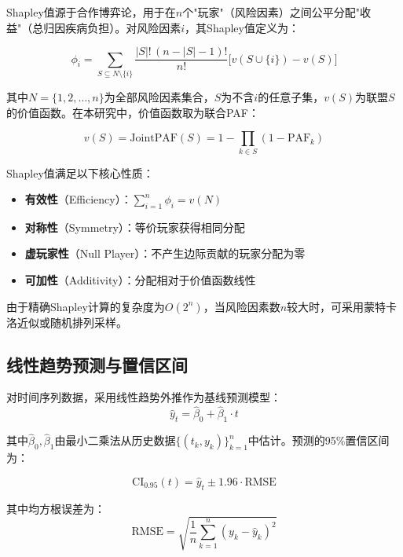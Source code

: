 \documentclass[12pt,a4paper]{ctexart}
\begin{document}
Shapley值源于合作博弈论，用于在$n$个"玩家"（风险因素）之间公平分配"收益"（总归因疾病负担）。对风险因素$i$，其Shapley值定义为：

\begin{equation}
\label{eq:shapley}
\phi_i = \sum_{S \subseteq N \setminus \{i\}} \frac{|S|!\,(n - |S| - 1)!}{n!}\bigl[v(S \cup \{i\}) - v(S)\bigr]
\end{equation}

其中$N = \{1, 2, \ldots, n\}$为全部风险因素集合，$S$为不含$i$的任意子集，$v(S)$为联盟$S$的价值函数。在本研究中，价值函数取为联合PAF：

\begin{equation}
    v(S) = \text{JointPAF}(S) = 1 - \prod_{k \in S}(1 - \text{PAF}_k)
\end{equation}

Shapley值满足以下核心性质：
\begin{itemize}[leftmargin=1.5em]
    \item \textbf{有效性}（Efficiency）：$\sum_{i=1}^{n} \phi_i = v(N)$
    \item \textbf{对称性}（Symmetry）：等价玩家获得相同分配
    \item \textbf{虚玩家性}（Null Player）：不产生边际贡献的玩家分配为零
    \item \textbf{可加性}（Additivity）：分配相对于价值函数线性
\end{itemize}

由于精确Shapley计算的复杂度为$O(2^n)$，当风险因素数$n$较大时，可采用蒙特卡洛近似或随机排列采样。

\subsection{线性趋势预测与置信区间}

对时间序列数据，采用线性趋势外推作为基线预测模型：
\begin{equation}
\label{eq:forecast}
    \hat{y}_t = \hat{\beta}_0 + \hat{\beta}_1 \cdot t
\end{equation}

其中$\hat{\beta}_0, \hat{\beta}_1$由最小二乘法从历史数据$\{(t_k, y_k)\}_{k=1}^{n}$中估计。预测的95\%置信区间为：

\begin{equation}
    \text{CI}_{0.95}(t) = \hat{y}_t \pm 1.96 \cdot \text{RMSE}
\end{equation}

其中均方根误差为：
\begin{equation}
    \text{RMSE} = \sqrt{\frac{1}{n}\sum_{k=1}^{n}(y_k - \hat{y}_k)^2}
\end{equation}
\end{document}
